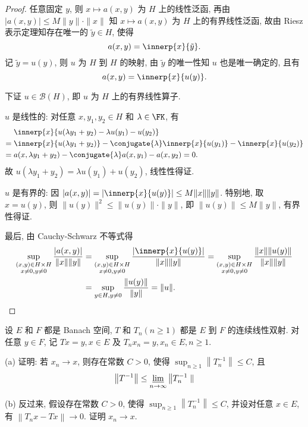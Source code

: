 \documentclass{mathexercise}
\begin{document}
\begin{proof}
    任意固定 $y$, 则 $x\mapsto a(x,y)$ 为 $H$ 上的线性泛函, 再由 $|a(x,y)|\leq M\|y\|\cdot\|x\|$
    知 $x\mapsto a(x,y)$ 为 $H$ 上的有界线性泛函, 故由 Riesz 表示定理知存在唯一的 $\tilde{y}\in H$, 使得
    \[a(x,y)=\innerp{x}{\tilde{y}}.\]
    记 $\tilde{y}=u(y)$, 则 $u$ 为 $H$ 到 $H$ 的映射, 由 $\tilde{y}$ 的唯一性知 $u$ 也是唯一确定的, 且有
    \[a(x,y)=\innerp{x}{u(y)}.\]

    下证 $u\in\mathcal{B}(H)$, 即 $u$ 为 $H$ 上的有界线性算子.

    $u$ 是线性的: 对任意 $x,y_1,y_2\in H$ 和 $\lambda\in\FK$, 有
    \begin{align*}
        & \innerp{x}{u(\lambda y_1+y_2)-\lambda u(y_1)-u(y_2)} \\
        ={}& \innerp{x}{u(\lambda y_1+y_2)}-\conjugate{\lambda}\innerp{x}{u(y_1)}-\innerp{x}{u(y_2)} \\
        ={}& a(x,\lambda y_1+y_2)-\conjugate{\lambda}a(x,y_1)-a(x,y_2)=0.
    \end{align*}
    故 $u(\lambda y_1+y_2)=\lambda u(y_1)+u(y_2)$, 线性性得证.

    $u$ 是有界的: 因 $|a(x,y)|=|\innerp{x}{u(y)}|\leq M\|x\|\|y\|$.
    特别地, 取 $x=u(y)$, 则 $\|u(y)\|^2\leq \|u(y)\|\cdot\|y\|$,
    即 $\|u(y)\|\leq M\|y\|$, 有界性得证.

    最后, 由 Cauchy-Schwarz 不等式得
    \begin{align*}
        \sup_{\substack{(x,y)\in H\times H \\ x\neq 0,y\neq 0}}\frac{|a(x,y)|}{\|x\|\|y\|}
        & =\sup_{\substack{(x,y)\in H\times H \\ x\neq 0,y\neq 0}}\frac{|\innerp{x}{u(y)}|}{\|x\|\|y\|}=\sup_{\substack{(x,y)\in H\times H \\ x\neq 0,y\neq 0}}\frac{\|x\|\|u(y)\|}{\|x\|\|y\|} \\
        & =\sup_{y\in H,y\neq 0}\frac{\|u(y)\|}{\|y\|}=\|u\|.\qedhere
    \end{align*}
\end{proof}



\begin{exercise}
    设 $E$ 和 $F$ 都是 Banach 空间, $T$ 和 $T_{n}(n \geq 1)$ 都是 $E$ 到 $F$ 的连续线性双射. 
    对任意 $y \in F$, 记 $T x=y, x \in E$ 及 $T_{n} x_{n}=y, x_{n} \in E, n \geq 1$.

    (a) 证明: 若 $x_{n}\to x$, 则存在常数 $C>0$, 使得 $\sup _{n \geq 1}\left\|T_{n}^{-1}\right\| \leq C$, 且
    \[
    \left\|T^{-1}\right\| \leq \varliminf_{n \rightarrow \infty}\left\|T_{n}^{-1}\right.\|
    \]

    (b) 反过来, 假设存在常数 $C>0$, 使得 $\sup _{n \geq 1}\left\|T_{n}^{-1}\right\| \leq C$, 
    并设对任意 $x \in E$, 有 $\left\|T_{n} x-T x\right\| \rightarrow 0$. 证明 $x_{n} \rightarrow x$.
\end{exercise}
\end{document}
